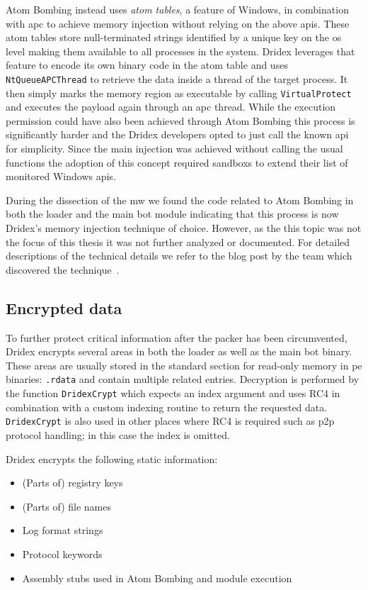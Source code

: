 Atom Bombing instead uses \emph{atom tables}, a feature of Windows, in combination with \gls{apc} to achieve memory injection without relying on the above \glspl{api}.
These atom tables store null-terminated strings identified by a unique key on the \gls{os} level making them available to all processes in the system.
Dridex leverages that feature to encode its own binary code in the atom table and uses \lstinline|NtQueueAPCThread| to retrieve the data inside a thread of the target process.
It then simply marks the memory region as executable by calling \lstinline|VirtualProtect| and executes the payload again through an \gls{apc} thread.
While the execution permission could have also been achieved through Atom Bombing this process is significantly harder and the Dridex developers opted to just call the known \gls{api} for simplicity.
Since the main injection was achieved without calling the usual functions the adoption of this concept required \glspl{sandbox} to extend their list of monitored Windows \glspl{api}.

During the dissection of the \gls{mw} we found the code related to Atom Bombing in both the loader and the main bot module indicating that this process is now Dridex's memory injection technique of choice.
However, as the this topic was not the focus of this thesis it was not further analyzed or documented.
For detailed descriptions of the technical details we refer to the blog post by the team which discovered the technique~\cite{liberman2016atombombing}.


\subsection{Encrypted data\label{subsec:Reverse_engineering_Dridex::Obfuscation_measures::Encrypted_data}}
To further protect critical information after the packer has been circumvented, Dridex encrypts several areas in both the loader as well as the main bot binary.
These areas are usually stored in the standard section for read-only memory in \gls{pe} binaries: \lstinline|.rdata| and contain multiple related entries.
Decryption is performed by the function \lstinline|DridexCrypt| which expects an index argument and uses RC4 in combination with a custom indexing routine to return the requested data.
\lstinline|DridexCrypt| is also used in other places where RC4 is required such as \gls{p2p} protocol handling; in this case the index is omitted.

Dridex encrypts the following static information:
\begin{itemize}
    \item (Parts of) registry keys
    \item (Parts of) file names
    \item Log format strings
    \item Protocol keywords
    \item Assembly stubs used in Atom Bombing and module execution
\end{itemize}

